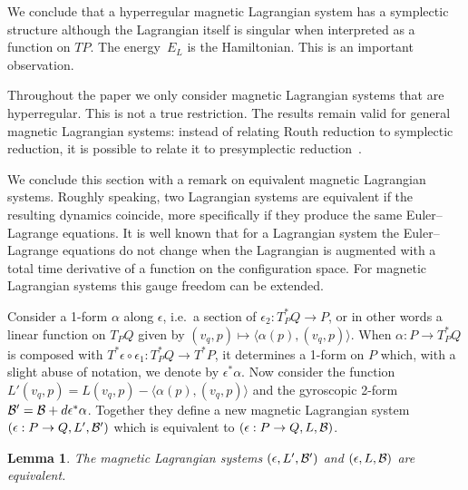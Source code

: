 \documentclass[11pt]{article}
\newtheorem{lemma}{Lemma}
\newcommand{\B}{{\cal B}}
\newcommand{\e}{\epsilon}
\begin{document}
We conclude that a hyperregular magnetic Lagrangian system has a symplectic structure although the Lagrangian itself is singular when interpreted as a function on $TP$. The energy~$E_L$ is the Hamiltonian. This is an important observation.

\begin{remark} Throughout the paper we only consider magnetic Lagrangian systems that are hyperregular. This is not a true restriction. The results remain valid for general magnetic Lagrangian systems: instead of relating Routh reduction to symplectic reduction, it is possible to relate it to presymplectic reduction~\cite{presympred}. \end{remark}

\begin{remark} We conclude this section with a remark on equivalent magnetic Lagrangian systems. Roughly speaking, two Lagrangian systems are equivalent if the resulting dynamics coincide, more specif\/ically if they produce the same Euler--Lagrange equations. It is well known that for a Lagrangian system the Euler--Lagrange equations do not change when the Lagrangian is augmented with a total time derivative of a function on the conf\/iguration space. For magnetic Lagrangian systems this gauge freedom can be extended.

Consider a 1-form $\alpha$ along $\e$, i.e.\ a section of $\e_2:T^*_PQ\to P$, or in other words a linear function on $T_PQ$ given by $(v_q,p)\mapsto \langle \alpha(p),(v_q,p)\rangle$. When $\alpha:P\to T^*_PQ$ is composed with $T^*\e\circ\e_1:T^*_PQ\to T^*P$, it determines a 1-form on $P$ which, with a slight abuse of notation, we denote by $\e^*\alpha$. Now consider the function $L'(v_q,p)= L(v_q,p)- \langle \alpha(p),(v_q,p)\rangle$ and the gyroscopic 2-form $\B'= \B +d\e^*\alpha$.  Together they def\/ine a new magnetic Lagrangian system $(\e:P\to Q, L',\B ')$ which is equivalent to $(\e:P\to Q,L,\B)$.
\end{remark}

\begin{lemma}
 The magnetic Lagrangian systems $(\e, L',\B ')$ and $(\e,L,\B)$ are equivalent.
\end{lemma}
\end{document}
